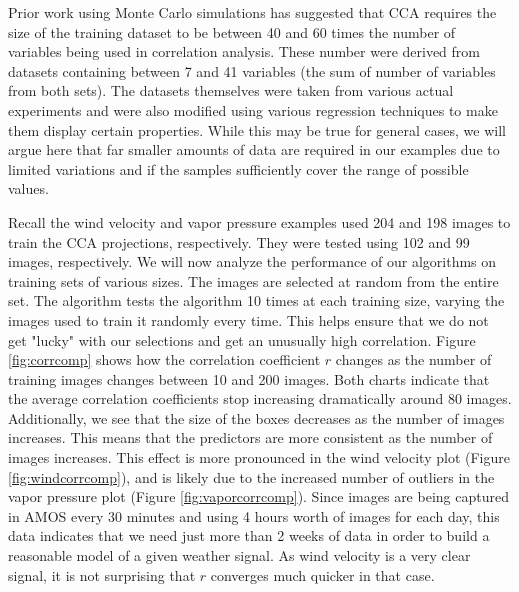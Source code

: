 Prior work \cite{barcikowski} using Monte Carlo simulations has suggested that CCA requires the size of the training dataset to be between 40 and 60 times the number of variables being used in correlation analysis. These number were derived from datasets containing between 7 and 41 variables (the sum of number of variables from both sets). The datasets themselves were taken from various actual experiments and were also modified using various regression techniques to make them display certain properties. While this may be true for general cases, we will argue here that far smaller amounts of data are required in our examples due to limited variations and if the samples sufficiently cover the range of possible values.

Recall the wind velocity  and vapor pressure examples used 204 and 198 images to train the CCA projections, respectively. They were tested using 102 and 99 images, respectively. We will now analyze the performance of our algorithms on training sets of various sizes. The images are selected at random from the entire set. The algorithm tests the algorithm 10 times at each training size, varying the images used to train it randomly every time. This helps ensure that we do not get "lucky" with our selections and get an unusually high correlation. Figure \ref{fig:corrcomp} shows how the correlation coefficient $r$ changes as the number of training images changes between 10 and 200 images. Both charts indicate that the average correlation coefficients stop increasing dramatically around 80 images. Additionally, we see that the size of the boxes decreases as the number of images increases. This means that the predictors are more consistent as the number of images increases. This effect is more pronounced in the wind velocity plot (Figure \ref{fig:windcorrcomp}), and is likely due to the increased number of outliers in the vapor pressure plot (Figure \ref{fig:vaporcorrcomp}). Since images are being captured in AMOS every 30 minutes and using 4 hours worth of images for each day, this data indicates that we need just more than 2 weeks of data in order to build a reasonable model of a given weather signal. As wind velocity is a very clear signal, it is not surprising that $r$ converges much quicker in that case.

